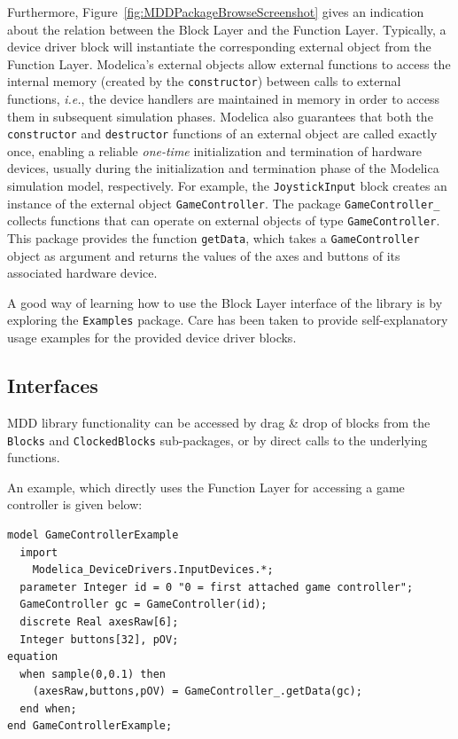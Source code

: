 \documentclass{resources/modelica}
\newcommand{\modelica}[1]{\lstinline[language=modelica]|#1|}
\begin{document}
Furthermore, Figure~\ref{fig:MDDPackageBrowseScreenshot} gives an indication
about the relation between the \textsf{Block Layer} and the \textsf{Function Layer}. Typically, a
device driver block will instantiate the corresponding external object from the
\textsf{Function Layer}. Modelica's external objects allow external functions to access the internal memory (created by the \modelica{constructor}) between calls to external functions, \textit{i.e.}, the
device handlers are maintained in memory in order to access them in subsequent simulation phases.
Modelica also guarantees that both the \modelica{constructor} and \modelica{destructor} functions of
an external object are called exactly once, enabling a reliable \emph{one-time} initialization and termination of hard\-ware devices, usually during the initialization and termination phase of the Modelica simulation model, respectively.
For example, the \modelica{JoystickInput} block creates an instance of the
external object \mbox{\modelica{GameController}.} The package
\modelica{GameController_} collects functions that can operate on external
objects of type \mbox{\modelica{GameController}.} This package provides the function
\modelica{getData}, which takes a \modelica{GameController} object as
argument and returns the values of the axes and buttons of its associated
hardware device.

A good way of learning how to use the \textsf{Block Layer} interface of the library is by
exploring the \modelica{Examples} package. Care has been taken to provide
self-explanatory usage examples for the provided device driver blocks.

\subsection{Interfaces}

MDD library functionality can be accessed by drag \& drop of blocks
from the \modelica{Blocks} and \modelica{ClockedBlocks} sub-packages, or by
direct calls to the underlying functions.

An example, which directly uses the \textsf{Function Layer} for accessing a
game controller is given below:
\begin{lstlisting}[language=modelica]
model GameControllerExample
  import
    Modelica_DeviceDrivers.InputDevices.*;
  parameter Integer id = 0 "0 = first attached game controller";
  GameController gc = GameController(id);
  discrete Real axesRaw[6];
  Integer buttons[32], pOV;
equation
  when sample(0,0.1) then
    (axesRaw,buttons,pOV) = GameController_.getData(gc);
  end when;
end GameControllerExample;
\end{lstlisting}
\end{document}
